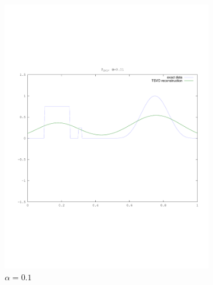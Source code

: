 \documentclass{article}
\begin{document}
\begin{figure}
\begin{subfigure}[b]{0.3\textwidth}
                \includegraphics[width=\textwidth]{plots/tsvd01.pdf}
                \caption{$\alpha=0.1$}
        \end{subfigure}%
        \begin{subfigure}[b]{0.3\textwidth}

\end{subfigure}
\end{figure}
\end{document}
